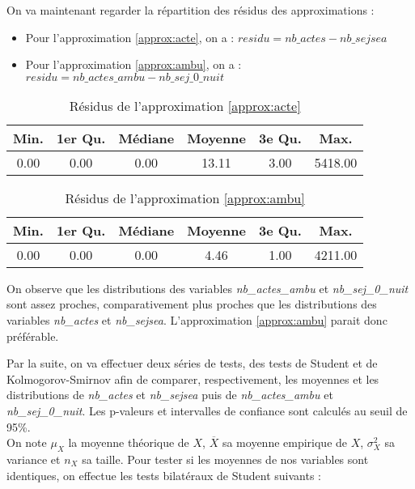On va maintenant regarder la répartition des résidus des approximations :
\begin{itemize}
    \item Pour l'approximation \ref{approx:acte}, on a : $residu = nb\_actes - nb\_sejsea$
    \item Pour l'approximation \ref{approx:ambu}, on a : $residu = nb\_actes\_ambu - nb\_sej\_0\_nuit$
\end{itemize}


\begin{table}[!ht]
\centering
\caption{Résidus de l'approximation \ref{approx:acte}} 
\begin{tabular}{cccccc}
  \hline
Min. & 1er Qu. & Médiane & Moyenne & 3e Qu. & Max. \\ 
  \hline
0.00 & 0.00 & 0.00 & 13.11 & 3.00 & 5418.00 \\ 
   \hline
\end{tabular}
\end{table}

\begin{table}[!ht]
\centering
\caption{Résidus de l'approximation \ref{approx:ambu}} 
\begin{tabular}{cccccc}
  \hline
Min. & 1er Qu. & Médiane & Moyenne & 3e Qu. & Max. \\ 
  \hline
0.00 & 0.00 & 0.00 & 4.46 & 1.00 & 4211.00 \\ 
   \hline
\end{tabular}
\end{table}

On observe que les distributions des variables  \textit{nb\_actes\_ambu} et \textit{nb\_sej\_0\_nuit} sont assez proches, comparativement plus proches que les distributions des variables \textit{nb\_actes} et \textit{nb\_sejsea}. L'approximation \ref{approx:ambu} parait donc préférable.

Par la suite, on va effectuer deux séries de tests, des tests de Student et de Kolmogorov-Smirnov afin de comparer, respectivement, les moyennes  et les distributions de \textit{nb\_actes} et \textit{nb\_sejsea} puis de \textit{nb\_actes\_ambu} et \textit{nb\_sej\_0\_nuit}. Les p-valeurs et intervalles de confiance sont calculés au seuil de 95\%.\\

On note $\mu_X$ la moyenne théorique de $X$, $\overline{X}$ sa moyenne empirique de $X$, $\sigma^2_X$ sa variance et $n_X$ sa taille. Pour tester si les moyennes de nos variables sont identiques, on effectue les tests bilatéraux de Student suivants : 

